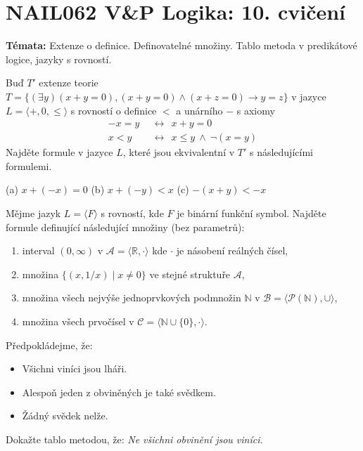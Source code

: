 \documentclass[a4paper,12pt]{article}
\begin{document}
\section*{NAIL062 V\&P Logika: 10. cvičení}

\textbf{Témata:}
Extenze o definice. Definovatelné množiny. Tablo metoda v predikátové logice, jazyky s rovností.


\medskip\begin{problem}
Buď $T'$ extenze teorie $T=\{(\exists y)(x+y=0),(x+y=0)\wedge (x+z=0)\rightarrow y=z\}$ v jazyce $L=\langle +,0,\le\rangle$ s rovností o definice $<$ a unárního $-$ s axiomy
\begin{align*}
    -x=y\ \ &\leftrightarrow\ \ x+y=0\\
    x<y\ \ &\leftrightarrow\ \ x\le y\ \wedge\ \neg(x=y)
\end{align*}
Najděte formule v jazyce $L$, které jsou ekvivalentní v $T'$ s následujícími formulemi.
\medskip

(a) $x+(-x)=0$ \hfill (b) $x+(-y)<x$ \hfill (c) $-(x+y)<-x$\hfill{}

\end{problem}


\medskip\begin{problem}
    Mějme jazyk $L=\langle F \rangle$ s rovností, kde $F$ je binární funkční symbol. Najděte formule definující následující množiny (bez parametrů):
    \begin{enumerate}
        \item interval $(0,\infty)$ v $\mathcal A=\langle\mathbb R, \cdot\rangle$ kde $\cdot$ je násobení reálných čísel,
        \item množina $\{(x, 1/x)\mid x\neq 0\}$ ve stejné struktuře $\mathcal A$,
        \item množina všech nejvýše jednoprvkových podmnožin $\mathbb N$ v $\mathcal B=\langle\mathcal P(\mathbb N),\cup\rangle$,
        \item množina všech prvočísel v $\mathcal C=\langle \mathbb N\cup\{0\}, \cdot\rangle$.
    \end{enumerate}
\end{problem}





\medskip\begin{problem}
    Předpokládejme, že:
    \begin{itemize}\it
    \item Všichni viníci jsou lháři.
    \item Alespoň jeden z obviněných je také svědkem.
    \item Žádný svědek nelže.
    \end{itemize}
    Dokažte tablo metodou, že: {\it Ne všichni obvinění jsou viníci.}
\end{problem} 
    
\end{document}
